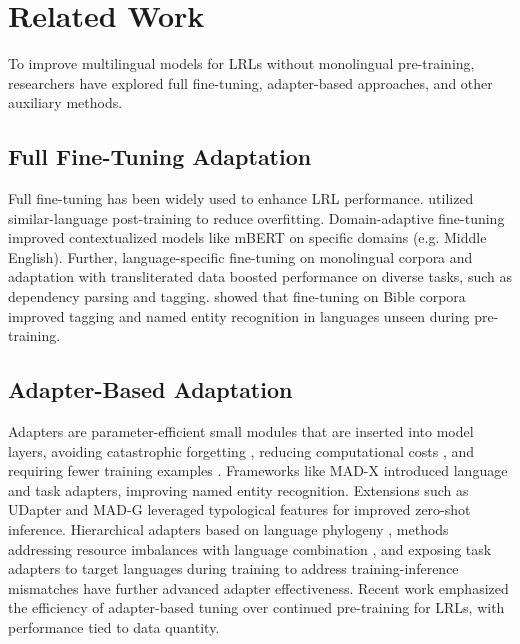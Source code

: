 \section{Related Work}
To improve multilingual models for LRLs without monolingual pre-training, researchers have explored full fine-tuning, adapter-based approaches, and other auxiliary methods.  

\subsection{Full Fine-Tuning Adaptation}  
Full fine-tuning has been widely used to enhance LRL performance. \citet{neubig2018rapidadaptationneuralmachine} utilized similar-language post-training to reduce overfitting. Domain-adaptive fine-tuning \cite{han2019unsuperviseddomainadaptationcontextualized} improved contextualized models like mBERT on specific domains (e.g. Middle English). Further, language-specific fine-tuning on monolingual corpora \cite{gururangan2020don, Chau_2020} and adaptation with transliterated data \cite{muller-etal-2021-unseen} boosted performance on diverse tasks, such as dependency parsing and tagging. \citet{ebrahimi2021adaptpretrainedmultilingualmodel} showed that fine-tuning on Bible corpora improved tagging and named entity recognition in languages unseen during pre-training.  


\subsection{Adapter-Based Adaptation}  
Adapters are parameter-efficient small modules that are inserted into model layers, avoiding catastrophic forgetting \cite{french1999catastrophic}, reducing computational costs \cite{houlsby2019parameter, strubell-etal-2019-energy}, and requiring fewer training examples \cite{faisal2022phylogenyinspiredadaptationmultilingualmodels}. Frameworks like MAD-X \cite{pfeiffer2020mad} introduced language and task adapters, improving named entity recognition. Extensions such as UDapter \cite{udapterlanguageadaptationtruly} and MAD-G \cite{ansell-etal-2021-mad-g} leveraged typological features for improved zero-shot inference. Hierarchical adapters based on language phylogeny \cite{faisal2022phylogenyinspiredadaptationmultilingualmodels}, methods addressing resource imbalances with language combination \cite{lee-etal-2022-fad, parovic-etal-2022-bad}, and exposing task adapters to target languages during training to address training-inference mismatches \cite{parović2023crosslingualtransfertargetlanguageready} have further advanced adapter effectiveness. Recent work \cite{pfeiffer-etal-2022-lifting, yong2023bloom1addinglanguagesupport} emphasized the efficiency of adapter-based tuning over continued pre-training for LRLs, with performance tied to data quantity.  

